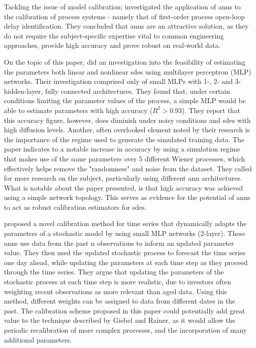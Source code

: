 \documentclass[11pt,oneside,openany,a4paper,english, report, goldenblock
]{usthesis}
\begin{document}
Tackling the issue of model calibration; \citet{Samad} investigated the application of \acrshort{ann}s to the calibration of process systems - namely that of first-order process open-loop delay identification. They concluded that \acrshort{ann}s are an attractive solution, as they do not require the subject-specific expertise vital to common engineering approaches, provide high accuracy and prove robust on real-world data.


On the topic of this paper, \citet{Xie} did an investigation into the feasibility of estimating the parameters both linear and nonlinear \acrshort{sde}s using multilayer perceptron (MLP) networks. Their investigation comprised only of small MLPs with 1-, 2- and 3-hidden-layer, fully connected architectures. They found that, under certain conditions limiting the parameter values of the process, a simple MLP would be able to estimate parameters with high accuracy ($R^2 > 0.93$). They report that this accuracy figure, however, does diminish under noisy conditions and \acrshort{sde}s with high diffusion levels. Another, often overlooked element noted by their research is the importance of the regime used to generate the simulated training data. The paper indicates to a notable increase in accuracy by using a simulation regime that makes use of the same parameters over 5 different Wiener processes, which effectively helps remove the "randomness" and noise from the dataset. They called for more research on the subject, particularly using different \acrshort{ann} architectures. What is notable about the paper presented, is that high accuracy was achieved using a simple network topology. This serves as evidence for the potential of \acrshort{ann}s to act as robust calibration estimators for \acrshort{sde}s.


\citet{Giebel} proposed a novel calibration method for time series that dynamically adapts the parameters of a stochastic model by using small MLP networks (2-layer). These \acrshort{ann}s use data from the past n observations to inform an updated parameter value. They then used the updated stochastic process to forecast the time series one day ahead, while updating the parameters at each time step as they proceed through the time series. They argue that updating the parameters of the stochastic process at each time step is more realistic, due to investors often weighting recent observations as more relevant than aged data. Using this method, different weights can be assigned to data from different dates in the past. The calibration scheme proposed in this paper could potentially add great value to the technique described by Giebel and Rainer, as it would allow the periodic recalibration of more complex processes, and the incorporation of many additional parameters. 
\end{document}
